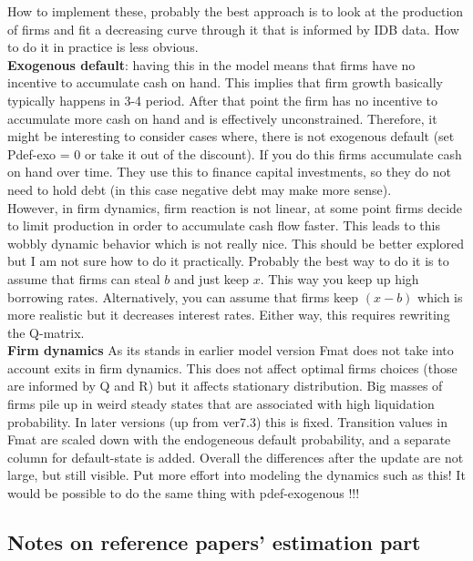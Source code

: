 \documentclass[12pt]{article}
\begin{document}
How to implement these, probably the best approach is to look at the production of firms and fit a decreasing curve through it that is informed by IDB data. How to do it in practice is less obvious. \vspace{3mm} \\
\textbf{Exogenous default}: having this in the model means that firms have no incentive to accumulate cash on hand. This implies that firm growth basically typically happens in 3-4 period. After that point the firm has no incentive to accumulate more cash on hand and is effectively unconstrained. Therefore, it might be interesting to consider cases where, there is not exogenous default (set Pdef-exo = 0 or take it out of the discount). If you do this firms accumulate cash on hand over time. They use this to finance capital investments, so they do not need to hold debt (in this case negative debt may make more sense).  \vspace{3mm} \\ However, in firm dynamics, firm reaction is not linear, at some point firms decide to limit production in order to accumulate cash flow faster. This leads to this wobbly dynamic behavior which is not really nice. This should be better explored but I am not sure how to do it practically. Probably the best way to do it is to assume that firms can steal $b$ and just keep $x$. This way you keep up high borrowing rates. Alternatively, you can assume that firms keep $(x-b)$ which is more realistic but it decreases interest rates. Either way, this requires rewriting the Q-matrix. \vspace{3mm} \\
\textbf{Firm dynamics} As its stands in earlier model version Fmat does not take into account exits in firm dynamics. This does not affect optimal firms choices (those are informed by Q and R) but it affects stationary distribution. Big masses of firms pile up in weird steady states that are associated with high liquidation probability. In later versions (up from ver7.3) this is fixed. Transition values in Fmat are scaled down with the endogeneous default probability, and a separate column for default-state is added. Overall the differences after the update are not large, but still visible. Put more effort into modeling the dynamics such as this! It would be possible to do the same thing with pdef-exogenous !!!

\newpage
\subsection*{Notes on reference papers' estimation part}
\end{document}
